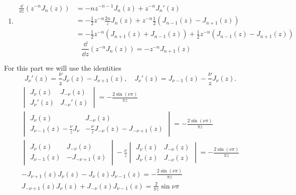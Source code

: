 {\begin{Solution}
\begin{enumerate}
\begin{gather*}
      \\
      \boxed{
        J_n'(z) = \frac{1}{2} \left ( J_{n-1} - J_{n+1} \right )
        }
    \end{gather*}
  \item
    \begin{align*}
      \frac{\dd}{\dd z} \left( z^{-n} J_n(z) \right)
      &= - n z^{-n-1} J_n(z) + z^{-n} J_n'(z) 
      \\
      &= - \frac{1}{2} z^{-n} \frac{2 n}{z} J_n(z) 
      + z^{-n} \frac{1}{2} \left( J_{n-1}(z) - J_{n+1}(z) \right) 
      \\
      &= - \frac{1}{2} z^{-n} \left( J_{n+1}(z) + J_{n-1}(z) \right)
      + \frac{1}{2} z^{-n} \left( J_{n-1}(z) - J_{n+1}(z) \right)
    \end{align*}
    \[
    \boxed{
      \frac{\dd}{\dd z}\left ( z^{-n} J_n(z) \right) = -z^{-n} J_{n+1} (z)
      }
    \]
  \end{enumerate}
\end{Solution}




\begin{Solution}
  For this part we will use the identities
  \[
  J_\nu'(z) = \frac{\nu}{z} J_\nu(z) - J_{\nu+1}(z), 
  \quad
  J_\nu'(z) = J_{\nu-1}(z) - \frac{\nu}{z} J_\nu(z).
  \]
  \begin{gather*}
    \begin{vmatrix}
      J_\nu(z) & J_{-\nu}(z) \\
      J_\nu'(z) & J_{-\nu}'(z)
    \end{vmatrix}
    = - \frac{2 \sin(\nu \pi)}{\pi z} 
    \\
    \begin{vmatrix}
      J_\nu(z) & J_{-\nu}(z) \\
      J_{\nu-1}(z) - \frac{\nu}{z} J_\nu & - \frac{\nu}{z} J_{-\nu}(z) -J_{-\nu+1}(z)
    \end{vmatrix}
    = - \frac{2 \sin(\nu \pi)}{\pi z} 
    \\
    \begin{vmatrix}
      J_\nu(z) & J_{-\nu}(z) \\
      J_{\nu-1}(z) & - J_{-\nu+1}(z)
    \end{vmatrix}
    - \frac{\nu}{z}
    \begin{vmatrix}
      J_\nu(z) & J_{-\nu}(z) \\
      J_\nu(z) & J_{-\nu}(z)
    \end{vmatrix}
    = - \frac{2 \sin(\nu \pi)}{\pi z} 
    \\
    - J_{\nu+1}(z) J_\nu(z) - J_{\nu}(z) J_{\nu-1}(z)
    = - \frac{2 \sin(\nu \pi)}{\pi z} 
    \\
    \boxed{
      J_{-\nu+1}(z) J_{\nu}(z) + J_{-\nu}(z)J_{\nu-1}(z) = \frac{2}{\pi z} \sin \nu \pi
      }
  \end{gather*}
\end{Solution}









}
